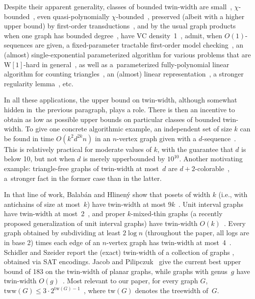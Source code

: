 \documentclass[a4paper,UKenglish,cleveref,hyperref,autoref]{lipics-v2021}
\newcommand{\tww}{\text{tww}}
\newcommand{\tw}{\text{tw}}
\begin{document}
Despite their apparent generality, classes of bounded twin-width are small~\cite{twin-width2}, $\chi$-bounded~\cite{twin-width3}, even quasi-polynomially $\chi$-bounded~\cite{PilipczukS22}, preserved (albeit with a higher upper bound) by first-order transductions~\cite{twin-width1}, and by the usual graph products when one graph has bounded degree~\cite{Pettersson22,twin-width2}, have VC density~1~\cite{tww-polyker,Przybyszewski22}, admit, when $O(1)$-sequences are given, a fixed-parameter tractable first-order model checking~\cite{twin-width1}, an (almost) single-exponential parameterized algorithm for various problems that are W$[1]$-hard in general~\cite{twin-width3}, as well as a~parameterized fully-polynomial linear algorithm for counting triangles~\cite{Kratsch22}, an (almost) linear representation~\cite{PilipczukSZ22}, a stronger regularity lemma~\cite{Przybyszewski22}, etc. 

In all these applications, the upper bound on twin-width, although somewhat hidden in~the previous paragraph, plays a role.
There is then an incentive to obtain as low as possible upper bounds on particular classes of bounded twin-width.
To give one concrete algorithmic example, an independent set of size $k$ can be found in time $O(k^2 d^{2k} n)$ in an $n$-vertex graph given with a $d$-sequence~\cite{twin-width3}.
This is relatively practical for moderate values of $k$, with the guarantee that $d$ is below 10, but not when $d$ is merely upperbounded by $10^{10}$.   
Another motivating example: triangle-free graphs of twin-width at most~$d$ are $d+2$-colorable~\cite{twin-width3}, a~stronger fact in the former case than in the latter.

In that line of work, Balab\'an and Hlinen\'y show that posets of width $k$ (i.e., with antichains of size at most~$k$) have twin-width at most $9k$~\cite{Balaban21}.
Unit interval graphs have twin-width at most~2~\cite{twin-width3}, and proper $k$-mixed-thin graphs (a recently proposed generalization of unit interval graphs) have twin-width $O(k)$~\cite{Balaban22}.
Every graph obtained by subdividing at least $2 \log n$ (throughout the paper, all logs are in base 2) times each edge of an $n$-vertex graph has twin-width at most~4~\cite{Berge21}.
Schidler and Szeider report the (exact) twin-width of a collection of graphs \cite{Schidler21}, obtained via SAT encodings.
Jacob and Pilipczuk~\cite{Jacob22} give the current best upper bound of 183 on the twin-width of planar graphs, while graphs with genus~$g$ have twin-width $O(g)$~\cite{reduced-bdw}.
Most relevant to our paper, for every graph $G$, $\tww(G) \leqslant 3 \cdot 2^{\tw(G)-1}$~\cite{Jacob22}, where %
$\tw(G)$ denotes the treewidth of~$G$.%
\end{document}
